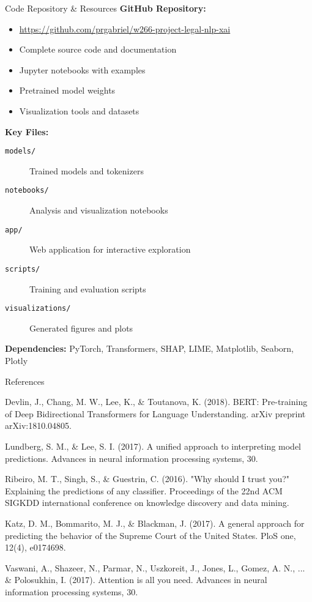 \begin{frame}{Code Repository \& Resources}
\textbf{GitHub Repository:}
\begin{itemize}
    \item \url{https://github.com/prgabriel/w266-project-legal-nlp-xai}
    \item Complete source code and documentation
    \item Jupyter notebooks with examples
    \item Pretrained model weights
    \item Visualization tools and datasets
\end{itemize}

\vspace{0.5cm}
\textbf{Key Files:}
\begin{description}
    \item[\texttt{models/}] Trained models and tokenizers
    \item[\texttt{notebooks/}] Analysis and visualization notebooks  
    \item[\texttt{app/}] Web application for interactive exploration
    \item[\texttt{scripts/}] Training and evaluation scripts
    \item[\texttt{visualizations/}] Generated figures and plots
\end{description}

\vspace{0.5cm}
\textbf{Dependencies:}
PyTorch, Transformers, SHAP, LIME, Matplotlib, Seaborn, Plotly
\end{frame}

\begin{frame}{References}
\footnotesize
\begin{thebibliography}{99}
 Devlin, J., Chang, M. W., Lee, K., \& Toutanova, K. (2018). BERT: Pre-training of Deep Bidirectional Transformers for Language Understanding. arXiv preprint arXiv:1810.04805.

 Lundberg, S. M., \& Lee, S. I. (2017). A unified approach to interpreting model predictions. Advances in neural information processing systems, 30.

 Ribeiro, M. T., Singh, S., \& Guestrin, C. (2016). "Why should I trust you?" Explaining the predictions of any classifier. Proceedings of the 22nd ACM SIGKDD international conference on knowledge discovery and data mining.

 Katz, D. M., Bommarito, M. J., \& Blackman, J. (2017). A general approach for predicting the behavior of the Supreme Court of the United States. PloS one, 12(4), e0174698.

 Vaswani, A., Shazeer, N., Parmar, N., Uszkoreit, J., Jones, L., Gomez, A. N., ... \& Polosukhin, I. (2017). Attention is all you need. Advances in neural information processing systems, 30.
\end{thebibliography}
\end{frame}
